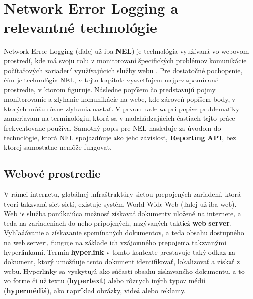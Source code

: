 \chapter{Network Error Logging a relevantné technológie}
\label{nel-and-related-technologies}             


Network Error Logging (ďalej už iba \textbf{NEL}) je technológia využívaná vo webovom prostredí, 
kde má svoju rolu v monitorovaní špecifických problémov komunikácie počítačových zariadení využívajúcich služby webu \cite{W3C-NEL}.
Pre dostatočné pochopenie, čím je technológia NEL, v tejto kapitole vysvetľujem najprv 
spomínané prostredie, v ktorom figuruje. 
Následne popíšem čo predstavujú pojmy monitorovanie a zlyhanie komunikácie na webe, kde zároveň popíšem body, v ktorých môžu rôzne zlyhania nastať. 
V prvom rade sa pri popise problematiky zameriavam na terminológiu, ktorá sa v nadchádzajúcich častiach tejto práce frekventovane používa. 
Samotný popis pre NEL nasleduje za úvodom do technológie, ktorá NEL spojazdňuje ako jeho závislosť, \textbf{Reporting API}, bez ktorej samostatne nemôže fungovať. %


\section{Webové prostredie}
\label{webove-prostredie}

V rámci internetu, globálnej infraštruktúry sieťou prepojených zariadení, ktorá tvorí takzvanú sieť sietí, existuje systém World Wide Web (ďalej už iba web).
Web je služba ponúkajúca možnosť získavať dokumenty uložené na internete, a teda na zariadeniach do neho pripojených, nazývaných taktiež \textbf{web server}. 
Vyhľadávanie a získavanie spomínaných dokumentov, a teda obsahu dostupného na web serveri, funguje na základe ich vzájomného prepojenia takzvanými hyperlinkami.
Termín \textbf{hyperlink} v tomto kontexte prestavuje taký odkaz na dokument, ktorý umožňuje tento dokument identifikovať, lokalizovať a získať z webu. 
Hyperlinky sa vyskytujú ako súčasti obsahu získavaného dokumentu, a to vo forme či už textu (\textbf{hypertext}) alebo rôznych iných typov médií (\textbf{hypermédiá}), ako napríklad obrázky, videá alebo reklamy. 


